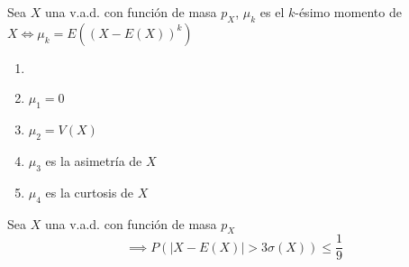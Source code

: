 \begin{defn}[Momentos de $X$]
    Sea $X$ una v.a.d. con función de masa $p_X$, $\mu_k$ es el $k$-ésimo momento de $X \iff \mu_k= E\left((X-E(X))^k\right)$
\end{defn}

\begin{obs}
    \begin{enumerate}
        \item[]
        \item $\mu_1=0$
        \item $\mu_2=V(X)$
        \item $\mu_3$ es la asimetría de $X$
        \item $\mu_4$ es la curtosis de $X$
    \end{enumerate}
\end{obs}

\begin{teo}
    Sea $X$ una v.a.d. con función de masa $p_X$
    \[\implies P(|X-E(X)| > 3\sigma(X))\leq \frac{1}{9}\]
\end{teo}



